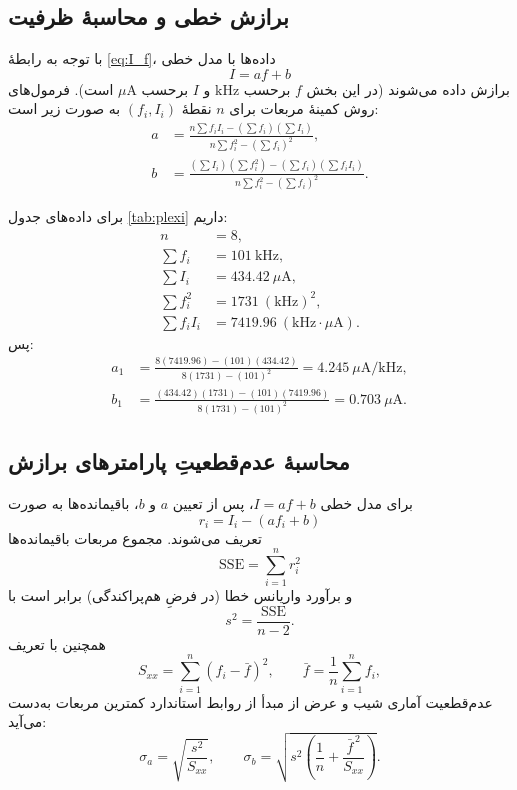 \documentclass[a4paper, 11pt]{article}
\begin{document}
\subsection*{برازش خطی و محاسبهٔ ظرفیت}

با توجه به رابطهٔ \eqref{eq:I_f}، داده‌ها با مدل خطی
\[
I = a f + b
\]
برازش داده می‌شوند (در این بخش $f$ برحسب \(\mathrm{kHz}\) و $I$ برحسب \(\mu\mathrm{A}\) است).
فرمول‌های روش کمینهٔ مربعات برای $n$ نقطهٔ $(f_i,I_i)$ به صورت زیر است:
\begin{align}
a &= \frac{n\sum f_i I_i - \left(\sum f_i\right)\left(\sum I_i\right)}
         {n\sum f_i^2 - \left(\sum f_i\right)^2}, \\
b &= \frac{\left(\sum I_i\right)\left(\sum f_i^2\right) - \left(\sum f_i\right)\left(\sum f_i I_i\right)}
         {n\sum f_i^2 - \left(\sum f_i\right)^2}.
\end{align}

برای داده‌های جدول \ref{tab:plexi} داریم:
\begin{align}
n &= 8,\\
\sum f_i &= 101~\mathrm{kHz},\\
\sum I_i &= 434.42~\mu\mathrm{A},\\
\sum f_i^2 &= 1731~(\mathrm{kHz})^2,\\
\sum f_i I_i &= 7419.96~(\mathrm{kHz}\cdot \mu\mathrm{A}).
\end{align}
پس:
\begin{align}
a_1 &= \frac{8(7419.96)- (101)(434.42)}{8(1731)-(101)^2}
= 4.245~\mu\mathrm{A/kHz},\\
b_1 &= \frac{(434.42)(1731)-(101)(7419.96)}{8(1731)-(101)^2}
=0.703~\mu\mathrm{A}.
\end{align}
\subsection*{محاسبهٔ عدم‌قطعیتِ پارامترهای برازش}
برای مدل خطی \(I=af+b\)، پس از تعیین \(a\) و \(b\)، باقیمانده‌ها به صورت
\[
r_i = I_i-(af_i+b)
\]
تعریف می‌شوند. مجموع مربعات باقیمانده‌ها
\[
\mathrm{SSE}=\sum_{i=1}^{n} r_i^2
\]
و برآورد واریانس خطا (در فرضِ هم‌پراکندگی) برابر است با
\[
s^2=\frac{\mathrm{SSE}}{n-2}.
\]
همچنین با تعریف
\[
S_{xx}=\sum_{i=1}^{n}(f_i-\bar f)^2,
\qquad
\bar f=\frac{1}{n}\sum_{i=1}^{n}f_i,
\]
عدم‌قطعیت آماری شیب و عرض از مبدأ از روابط استاندارد کمترین مربعات به‌دست می‌آید:
\begin{equation}
\sigma_a=\sqrt{\frac{s^2}{S_{xx}}},
\qquad
\sigma_b=\sqrt{s^2\left(\frac{1}{n}+\frac{\bar f^{\,2}}{S_{xx}}\right)}.
\label{eq:unc_lin}
\end{equation}
\end{document}
